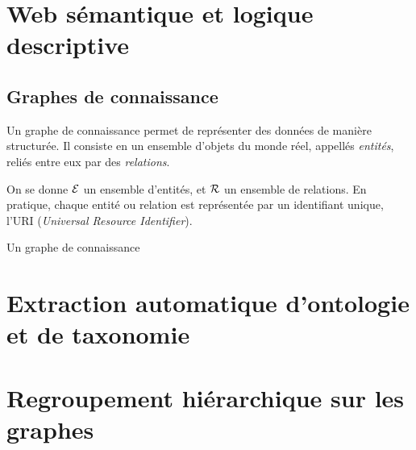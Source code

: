 \label{chap:revue}
\section{Web sémantique et logique descriptive}
\label{sec:dl}

\subsection{Graphes de connaissance}

Un graphe de connaissance permet de représenter des données de manière structurée. Il consiste en un ensemble d'objets du monde réel, appellés \textit{entités}, reliés entre eux par des \textit{relations}.

On se donne $\mathcal{E}$ un ensemble d'entités, et $\mathcal{R}$ un ensemble de relations. En pratique, chaque entité ou relation est représentée par un identifiant unique, l'URI (\textit{Universal Resource Identifier}).

Un graphe de connaissance 

\section{Extraction automatique d'ontologie et de taxonomie}

\section{Regroupement hiérarchique sur les graphes}
